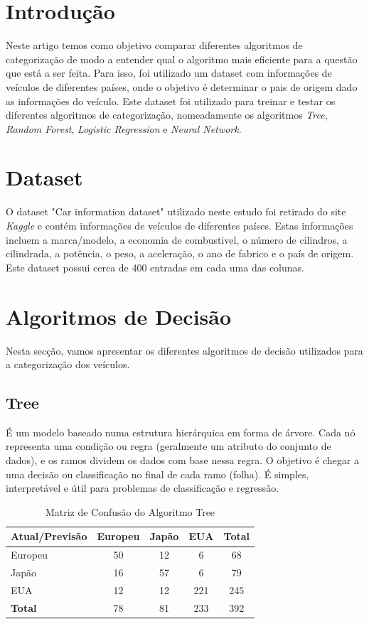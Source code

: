 \documentclass[conference]{IEEEtran}
\begin{document}
\section{Introdução}
Neste artigo temos como objetivo comparar diferentes algoritmos de categorização de modo a entender qual o algoritmo mais eficiente para
a questão que está a ser feita. Para isso, foi utilizado um dataset com informações de veículos de diferentes países, onde o objetivo é
determinar o pais de origem dado as informações do veículo. Este dataset foi utilizado para treinar e testar os diferentes algoritmos de
categorização, nomeadamente os algoritmos \textit{Tree}, \textit{Random Forest}, \textit{Logistic Regression} e \textit{Neural Network}.

\section{Dataset}
O dataset "Car information dataset" \cite{ref1} utilizado neste estudo foi retirado do site \textit{Kaggle} e contém informações de 
veículos de diferentes países. Estas informações incluem a marca/modelo, a economia de combustivel, o número de cilindros, a cilindrada, 
a potência, o peso, a aceleração, o ano de fabrico e o país de origem. Este dataset possui cerca de 400 entradas em cada uma das colunas.

\section{Algoritmos de Decisão}
Nesta secção, vamos apresentar os diferentes algoritmos de decisão utilizados para a categorização dos veículos.

\subsection{Tree}
É um modelo baseado numa estrutura hierárquica em forma de árvore. Cada nó representa uma condição ou regra 
(geralmente um atributo do conjunto de dados), e os ramos dividem os dados com base nessa regra. O objetivo 
é chegar a uma decisão ou classificação no final de cada ramo (folha). É simples, interpretável e útil para 
problemas de classificação e regressão.
\begin{table}[h!]
    \centering
    \caption{Matriz de Confusão do Algoritmo Tree}
    \begin{tabular}{lcccc}
    \toprule
    \textbf{Atual/Previsão} & \textbf{Europeu} & \textbf{Japão} & \textbf{EUA} & \textbf{Total} \\
    \midrule
    Europeu & 50 & 12 & 6 & 68 \\
    Japão  & 16 & 57 & 6 & 79 \\
    EUA    & 12 & 12 & 221 & 245 \\
    \midrule
    \textbf{Total} & 78 & 81 & 233 & 392 \\
    \bottomrule
    \end{tabular}
    \label{tab:conf_matrix}
\end{table}
\end{document}

